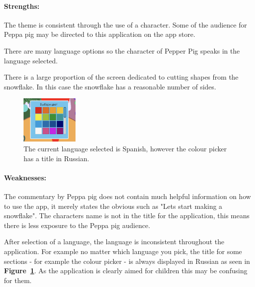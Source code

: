 \documentclass[11pt]{article}
\begin{document}
                \paragraph{Strengths:}
                The theme is consistent through the use of a character. Some of the audience for Peppa pig may be directed to this application on the app store. 
                
                There are many language options so the character of Pepper Pig speaks in the language selected.
                
                There is a large proportion of the screen dedicated to cutting shapes from the snowflake. In this case the snowflake has a reasonable number of sides. 

                \begin{figure}
                    \includegraphics[width=0.25\textwidth]{Images/peppa/peppaRussian.png}
                    \caption{The current language selected is Spanish, however the colour picker has a title in Russian.}
                    \label{fig:peppaRussian}
                \end{figure}
                \paragraph{Weaknesses:}
                
                The commentary by Peppa pig does not contain much helpful information on how to use the app, it merely states the obvious such as "Lets start making a snowflake". The characters name is not in the title for the application, this means there is less exposure to the Peppa pig audience.
                
                After selection of a language, the language is inconsistent throughout the application. For example no matter which language you pick, the title for some sections - for example the colour picker - is always displayed in Russian as seen in \textbf{Figure~\ref{fig:peppaRussian}}.  As the application is clearly aimed for children this may be confusing for them.
                
\end{document}
